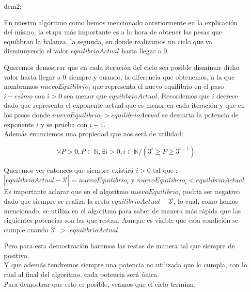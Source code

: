 dem2:

En nuestro algoritmo como hemos mencionado anteriormente en la explicaci\'on del mismo, la etapa m\'as importante es a la hora de obtener las pesas que equilibran la balanza, la segunda, en donde realizamos un ciclo que va disminuyendo el valor $equilibrioActual$ hasta llegar a 0. 

Queremos demostrar que en cada iteraci\'on del ciclo sea posible disminuir dicho valor hasta llegar a 0 siempre y cuando, la diferencia que obtenemos, a la que nombramos $nuevoEquilibrio_{i}$ que representa el nuevo equilibrio en el paso $i-esimo$ con $i > 0$ sea menor que $equilibrioActual$. Recordemos que $i$ decrece dado que representa el exponente actual que es menor en cada iteración y que en los pasos donde $nuevoEquilibrio_{i} > equilibrioActual$  se descarta	 la potencia de exponente $i$ y se prueba con $i-1$.\\

Además enunciemos una propiedad que nos será de utilidad:

\begin{equation}
\forall P > 0, P \in \mathbb{N}, \exists i > 0, i \in \mathbb{N} / (3^i \geq P \geq 3^{i-1})  
\end{equation} \label{eq:prop}

Queremos ver entonces que siempre existirá $i > 0$ tal que :\\

$|equilibrioActual - {3^i}| = nuevoEquilibrio_{i}$ y $nuevoEquilibrio_{i} < equilibrioActual$\\ 

Es importante aclarar que en el algoritmo $nuevoEquilibrio_{i}$ podria ser negativo dado que siempre se realiza la resta $equilibrioActual - {3^i}$, lo cual, como hemos mencionado, se utiliza en el algoritmo para saber de manera más rápida que las siguientes potencias son las que restan. Aunque es visible que esta condición se cumple cuando ${3^i}$ $>$ $equilibrioActual$. 
  
Pero para esta demostración haremos las restas de manera tal que siempre de positivo.\\ 
 

Y que además tendremos siempre una potencia no utilizada que lo cumpla, con lo cual al final del algoritmo, cada potencia será única.\\ 

Para demostrar que esto es posible, veamos que el ciclo termina:\\ 

